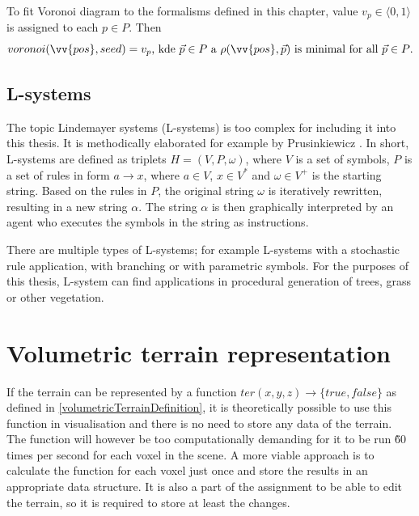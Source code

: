 To fit Voronoi diagram to the formalisms defined in this chapter, value $v_p \in \langle0,1\rangle$ is assigned to each $p \in P$. Then
\begin{equation}
	voronoi(\vv{pos}, seed) = v_p \text{, kde $\vec{p} \in P$ a $\rho(\vv{pos}, \vec{p})$ is minimal for all $\vec{p} \in P$.}
\end{equation}

\subsection{L-systems}
The topic Lindemayer systems (L-systems) is too complex for including it into this thesis. It is methodically elaborated for example by Prusinkiewicz \cite{OstebeeArnold1997TABo}. In short, L-systems are defined as triplets $H = (V, P, \omega)$, where $V$ is a set of symbols, $P$ is a set of rules in form $a \rightarrow x$, where $a \in V$, $x \in V^*$ and $\omega \in V^+$ is the starting string. Based on the rules in $P$, the original string $\omega$ is iteratively rewritten, resulting in a new string $\alpha$. The string $\alpha$ is then graphically interpreted by an agent who executes the symbols in the string as instructions.

There are multiple types of L-systems; for example L-systems with a stochastic rule application, with branching or with parametric symbols. For the purposes of this thesis, L-system can find applications in procedural generation of trees, grass or other vegetation.


\section{Volumetric terrain representation}
If the terrain can be represented by a function $ter(x, y, z) \rightarrow \{true, false\}$ as defined in \ref{volumetricTerrainDefinition}, it is theoretically possible to use this function in visualisation and there is no need to store any data of the terrain. The function will however be too computationally demanding for it to be run \~60 times per second for each voxel in the scene. A more viable approach is to calculate the function for each voxel just once and store the results in an appropriate data structure. It is also a part of the assignment to be able to edit the terrain, so it is required to store at least the changes.


